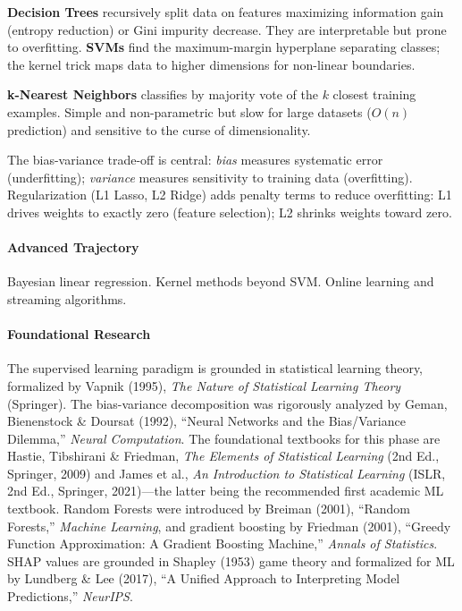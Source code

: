 \documentclass[11pt, a4paper, oneside]{report}
\begin{document}
\textbf{Decision Trees} recursively split data on features maximizing information gain (entropy reduction) or Gini impurity decrease. They are interpretable but prone to overfitting. \textbf{SVMs} find the maximum-margin hyperplane separating classes; the kernel trick maps data to higher dimensions for non-linear boundaries.

\textbf{k-Nearest Neighbors} classifies by majority vote of the $k$ closest training examples. Simple and non-parametric but slow for large datasets ($O(n)$ prediction) and sensitive to the curse of dimensionality.

The bias-variance trade-off is central: \emph{bias} measures systematic error (underfitting); \emph{variance} measures sensitivity to training data (overfitting). Regularization (L1 Lasso, L2 Ridge) adds penalty terms to reduce overfitting: L1 drives weights to exactly zero (feature selection); L2 shrinks weights toward zero.

\paragraph{Advanced Trajectory} Bayesian linear regression. Kernel methods beyond SVM. Online learning and streaming algorithms.


\paragraph{Foundational Research} The supervised learning paradigm is grounded in statistical learning theory, formalized by Vapnik (1995), \emph{The Nature of Statistical Learning Theory} (Springer). The bias-variance decomposition was rigorously analyzed by Geman, Bienenstock \& Doursat (1992), ``Neural Networks and the Bias/Variance Dilemma,'' \emph{Neural Computation}. The foundational textbooks for this phase are Hastie, Tibshirani \& Friedman, \emph{The Elements of Statistical Learning} (2nd Ed., Springer, 2009) and James et al., \emph{An Introduction to Statistical Learning} (ISLR, 2nd Ed., Springer, 2021)---the latter being the recommended first academic ML textbook. Random Forests were introduced by Breiman (2001), ``Random Forests,'' \emph{Machine Learning}, and gradient boosting by Friedman (2001), ``Greedy Function Approximation: A Gradient Boosting Machine,'' \emph{Annals of Statistics}. SHAP values are grounded in Shapley (1953) game theory and formalized for ML by Lundberg \& Lee (2017), ``A Unified Approach to Interpreting Model Predictions,'' \emph{NeurIPS}.
\end{document}
